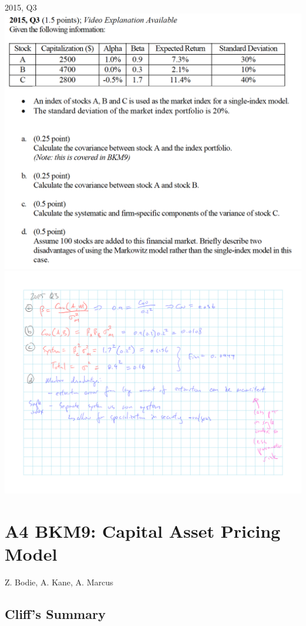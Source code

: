 \documentclass[]{book}
\theoremstyle{definition}
\theoremstyle{definition}
\theoremstyle{remark}
\begin{document}
 2015, Q3 \includegraphics{Section A/questions/2015-3Q.png}
\includegraphics{Section A/questions/2015-3A.png}

\chapter{A4 BKM9: Capital Asset Pricing
Model}\label{a4-bkm9-capital-asset-pricing-model}

Z. Bodie, A. Kane, A. Marcus

\section{Cliff's Summary}\label{cliffs-summary-3}
\end{document}
